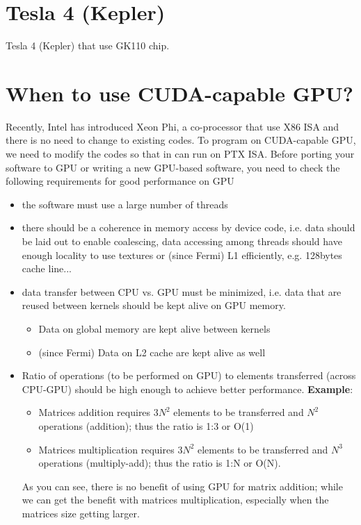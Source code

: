 \section{Tesla 4 (Kepler)}

Tesla 4 (Kepler) that use GK110 chip.




\section{When to use CUDA-capable GPU?}
\label{sec:when-use-cuda}

Recently, Intel has introduced Xeon Phi, a co-processor that use X86 ISA and
there is no need to change to existing codes. To program on CUDA-capable GPU, we
need to modify the codes so that in can run on PTX ISA. Before porting your
software to GPU or writing a new GPU-based software, you need to check the
following requirements for good performance on GPU

\begin{itemize}
\item the software must use a large number of threads

\item there should be a coherence in memory access by device code,
  i.e. data should be laid out to enable coalescing, data accessing
  among threads should have enough locality to use textures or (since
  Fermi) L1 efficiently, e.g. 128bytes cache line... 

\item data transfer between CPU vs. GPU must be minimized, i.e. data
  that are reused between kernels should be kept alive on GPU memory.
  \begin{itemize}
  \item Data on global memory are kept alive between kernels
  \item (since Fermi) Data on L2 cache are kept alive as well
  \end{itemize}

\item Ratio of operations (to be performed on GPU) to elements
  transferred (across CPU-GPU) should be high enough to achieve better
  performance. {\bf Example}:
  \begin{itemize}
  \item Matrices addition requires $3N^2$ elements to be transferred
    and $N^2$ operations (addition); thus the ratio is 1:3 or O(1)
  \item Matrices multiplication requires $3N^2$ elements to be
    transferred and $N^3$ operations (multiply-add); thus the ratio is
    1:N or O(N). 
  \end{itemize}
  As you can see, there is no benefit of using GPU for matrix
  addition; while we can get the benefit with matrices multiplication,
  especially when the matrices size getting larger.
\end{itemize}

